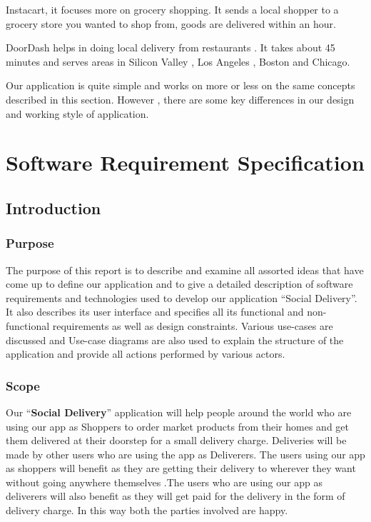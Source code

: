 \documentclass{report}
\begin{document}
Instacart, it focuses more on grocery shopping. It sends a local shopper to a grocery store you wanted to shop from, goods are delivered within an hour.

DoorDash helps in doing local delivery from restaurants . It takes about 45 minutes and serves areas in Silicon Valley , Los Angeles , Boston and Chicago.

Our application is quite simple and works on more or less on the same concepts described in this section. However , there are some key differences in our design and working style of application.

\chapter{Software Requirement Specification}
\section{Introduction}
\subsection{Purpose}
The purpose of this report is to describe and examine all assorted ideas that have come up to define our application and to give a detailed description of software requirements and technologies used to develop our application “Social Delivery”. It also describes its user interface and specifies all its functional and non-functional requirements as well as design constraints. Various use-cases are discussed and Use-case diagrams are also used to explain the structure of the application and provide all actions performed by various actors.

\subsection{Scope}
Our “\textbf{Social Delivery}” application will help people around the world who are using our app as Shoppers to order market products from their homes and get them delivered at their doorstep for a small delivery charge. Deliveries will be made by other users who are using the app as Deliverers.
The users using our app as shoppers will benefit as they are getting their delivery to wherever they want without going anywhere themselves .The users who are using our app as deliverers will also benefit as they will get paid for the delivery in the form of delivery charge.
In this way both the parties involved are happy.
\end{document}
